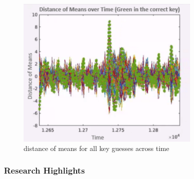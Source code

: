 \begin{figure}[!ht]
    \centering
    \includegraphics[width=0.8\textwidth]{images/Lecture6/all.png}
    \caption{distance of means for all key guesses across time \linebreak[4]} \label{fig:all}
\end{figure}

\subsubsection{Research Highlights}


